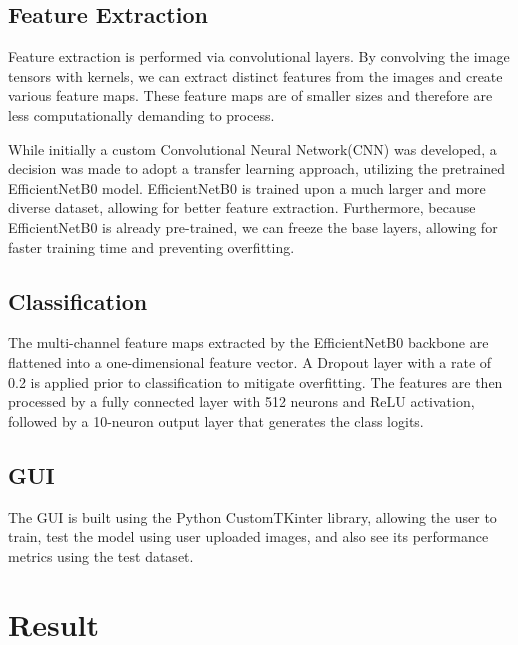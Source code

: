 \documentclass[8pt,a4paper,twocolumn,twoside]{tau-class/tau}
\begin{document}
    	\subsection{Feature Extraction}
		Feature extraction is performed via convolutional layers. By convolving the image tensors with kernels, we can extract distinct features from the images and create various feature maps. These feature maps are of smaller sizes and therefore are less computationally demanding to process. 

		While initially a custom Convolutional Neural Network(CNN) was  developed, a decision was made to adopt a transfer learning approach, utilizing the pretrained EfficientNetB0 model. EfficientNetB0 is trained upon a much larger and more diverse dataset, allowing for better feature extraction. Furthermore, because EfficientNetB0 is already pre-trained, we can freeze the base layers, allowing for faster training time and preventing overfitting.



	\subsection{Classification}

		The multi-channel feature maps extracted by the EfficientNetB0 backbone are flattened into a one-dimensional feature vector. A Dropout layer with a rate of 0.2 is applied prior to classification to mitigate overfitting. The features are then processed by a fully connected layer with 512 neurons and ReLU activation, followed by a 10-neuron output layer that generates the class logits.

	\subsection{GUI}
		The GUI is built using the Python CustomTKinter library, allowing the user to train, test the model using user uploaded images, and also see its performance metrics using the test dataset.
\section{Result}
\end{document}
